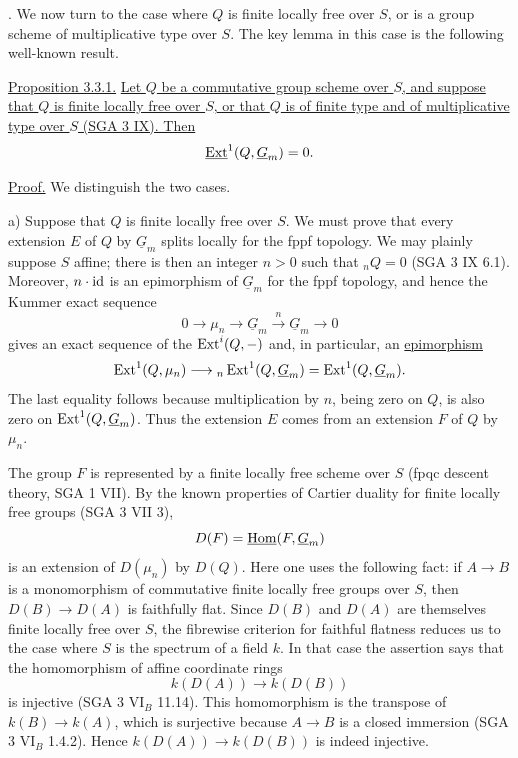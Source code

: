 
\medskip
{}.  We now turn to the case where $Q$ is finite locally
free over $S$, or is a group scheme of multiplicative type over $S$.
The key lemma in this case is the following well-known result.

\medskip
\noindent\underline{Proposition 3.3.1.}  \underline{Let $Q$ be a
commutative group scheme over $S$, and suppose that $Q$ is finite
locally free over $S$, or that $Q$ is of finite type and of
multiplicative type over $S$ (SGA 3 IX).  Then}
\[
 \uExt^1(Q,\underline G_m)=0.
\]

\noindent\underline{Proof.}  We distinguish the two cases.

\medskip
\noindent a) Suppose that $Q$ is finite locally free over $S$.  We
must prove that every extension $E$ of $Q$ by $\underline G_m$ splits
locally for the fppf topology.  We may plainly suppose $S$ affine;
there is then an integer $n>0$ such that ${}_nQ=0$ (SGA 3 IX 6.1).
Moreover, $n\cdot\mathrm{id}$ is an epimorphism of $\underline G_m$ for the
fppf topology, and hence the Kummer exact sequence
\[
 0\longrightarrow\mu_n\longrightarrow\underline G_m
 \xrightarrow{\ n\ }\underline G_m\longrightarrow0
\]
gives an exact sequence of the $\operatorname{Ext}^i(Q,-)$ and, in particular, an
\underline{epimorphism}
\[
 \Ext^1(Q,\mu_n)\longrightarrow
 {}_n\Ext^1(Q,\underline G_m)=\Ext^1(Q,\underline G_m).
\]
The last equality follows because multiplication by $n$, being zero
on $Q$, is also zero on $\Ext^1(Q,\underline G_m)$.  Thus the
extension $E$ comes from an extension $F$ of $Q$ by $\mu_n$.

The group $F$ is represented by a finite locally free scheme over $S$
(fpqc descent theory, SGA 1 VII).  By the known properties of Cartier
duality for finite locally free groups (SGA 3 VII 3),
\[
 D(F)=\uHom(F,\underline G_m)
\]
is an extension of $D(\mu_n)$ by $D(Q)$.  Here one uses the following
fact: if $A\longrightarrow B$ is a monomorphism of commutative finite
locally free groups over $S$, then
$D(B)\longrightarrow D(A)$ is faithfully flat.  Since $D(B)$ and
$D(A)$ are themselves finite locally free over $S$, the fibrewise
criterion for faithful flatness reduces us to the case where $S$ is
the spectrum of a field $k$.  In that case the assertion says that
the homomorphism of affine coordinate rings
\[
 k(D(A))\longrightarrow k(D(B))
\]
is injective (SGA 3 $\mathrm{VI}_B$ 11.14).  This homomorphism is the
transpose of $k(B)\longrightarrow k(A)$, which is surjective because
$A\longrightarrow B$ is a closed immersion (SGA 3 $\mathrm{VI}_B$
1.4.2).  Hence $k(D(A))\longrightarrow k(D(B))$ is indeed injective.

